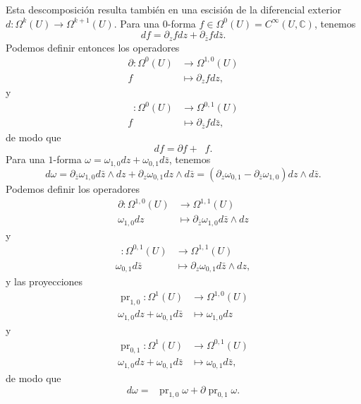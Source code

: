 \documentclass[autocontact]{gaceta}
\theoremstyle{definition} \newtheorem{defn}[thm]{Definición}
\theoremstyle{definition} \newtheorem{ejemplo}[thm]{Ejemplo}
\theoremstyle{definition} \newtheorem{ejercicio}[thm]{Ejercicio}
\def\CC{\mathbb{C}}
\DeclareMathOperator{\delbar}{\bar{\partial}}
\DeclareMathOperator{\pr}{pr}
\begin{document}
    Esta descomposición resulta también en una escisión de la diferencial exterior $d:\Omega^k(U) \rightarrow \Omega^{k+1}(U)$. Para una $0$-forma $f\in \Omega^0(U)=C^\infty(U,\CC)$, tenemos
    \begin{equation*}
      df = \partial_ zf  dz + \partial _{\bar{z}} f d\bar{z}.
    \end{equation*}
    Podemos definir entonces los operadores
    \begin{align*}
      \partial :\Omega^0(U)&\longrightarrow \Omega^{1,0}(U)\\ 
        f &\longmapsto \partial_z f dz, 
      \end{align*}
      y
    \begin{align*}
      \delbar :\Omega^0(U)&\longrightarrow \Omega^{0,1}(U)\\ 
      f &\longmapsto \partial_{\bar{z}} f d\bar{z}, 
      \end{align*}
      de modo que
      \begin{equation*}
	df = \partial f + \delbar f.
      \end{equation*}
      Para una $1$-forma $\omega=\omega_{1,0} dz + \omega_{0,1} d\bar{z}$, tenemos
      \begin{equation*}
	d\omega = \partial_{\bar{z}} \omega_{1,0} d\bar{z} \wedge dz + \partial_z \omega_{0,1} dz \wedge d\bar{z} = (\partial_{z} \omega_{0,1}-\partial_{\bar{z}} \omega_{1,0}) dz\wedge d\bar{z}.
      \end{equation*}
      Podemos definir los operadores
      \begin{align*}
	\partial :\Omega^{1,0}(U)&\longrightarrow \Omega^{1,1}(U)\\ 
	\omega_{1,0} dz &\longmapsto \partial_{\bar{z}} \omega_{1,0}d\bar{z} \wedge dz 
	\end{align*}
	y
      \begin{align*}
	\delbar :\Omega^{0,1}(U)&\longrightarrow \Omega^{1,1}(U)\\ 
	\omega_{0,1} d\bar{z} &\longmapsto \partial_{z} \omega_{0,1} d\bar{z} \wedge dz ,
	\end{align*}
	y las proyecciones
	\begin{align*}
	  \pr_{1,0} :\Omega^1(U)&\longrightarrow \Omega^{1,0}(U)\\ 
	  \omega_{1,0}dz + \omega_{0,1} d\bar{z} &\longmapsto \omega_{1,0}dz 
	  \end{align*}
	  y
	\begin{align*}
	  \pr_{0,1} :\Omega^1(U)&\longrightarrow \Omega^{0,1}(U)\\ 
	  \omega_{1,0}dz + \omega_{0,1} d\bar{z} &\longmapsto \omega_{0,1}d\bar{z}, 
	  \end{align*}
	  de modo que
	  \begin{equation*}
	    d\omega = \delbar \pr_{1,0} \omega + \partial \pr_{0,1} \omega.
	  \end{equation*}
\end{document}
